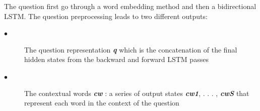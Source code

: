 The question first go through a word embedding method and then a bidirectional LSTM.
The question preprocessing leads to two different outputs:

\begin{description}
	\item[$\bullet$] The question representation \textbf{\textit{q}} which is the concatenation of the final hidden states from the backward and forward LSTM passes
	\item[$\bullet$] The contextual words \textbf{\textit{cw}} : a series of output states \textbf{\textit{cw1}}, . . . , \textbf{\textit{cwS}} that represent each word in the context of the question
\end{description}




